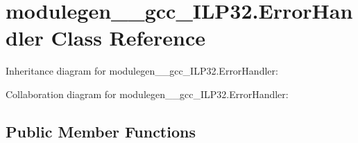 \hypertarget{classmodulegen____gcc__ILP32_1_1ErrorHandler}{}\section{modulegen\+\_\+\+\_\+gcc\+\_\+\+I\+L\+P32.\+Error\+Handler Class Reference}
\label{classmodulegen____gcc__ILP32_1_1ErrorHandler}


Inheritance diagram for modulegen\+\_\+\+\_\+gcc\+\_\+\+I\+L\+P32.\+Error\+Handler\+:


Collaboration diagram for modulegen\+\_\+\+\_\+gcc\+\_\+\+I\+L\+P32.\+Error\+Handler\+:
\subsection*{Public Member Functions}
